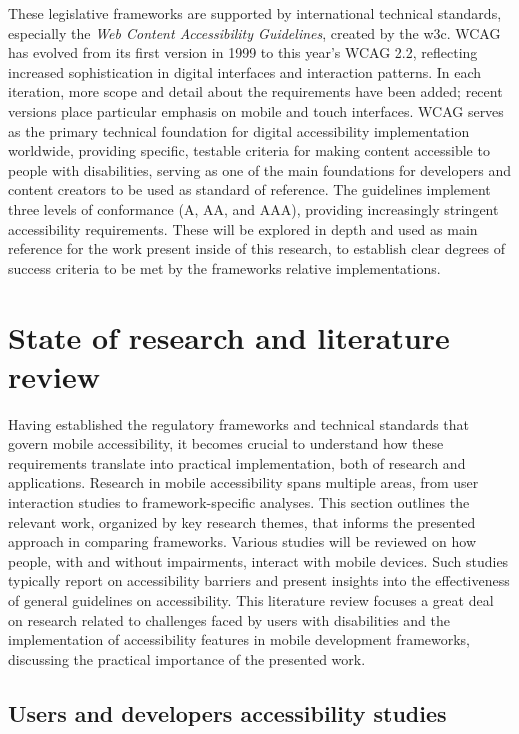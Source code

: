 These legislative frameworks are supported by international technical standards, especially the \textit{Web Content Accessibility Guidelines}, created by the \acrshort{w3c}. WCAG has evolved from its first version in 1999 to this year's WCAG 2.2, reflecting increased sophistication in digital interfaces and interaction patterns. In each iteration, more scope and detail about the requirements have been added; recent versions place particular emphasis on mobile and touch interfaces. WCAG serves as the primary technical foundation for digital accessibility implementation worldwide, providing specific, testable criteria for making content accessible to people with disabilities, serving as one of the main foundations for developers and content creators to be used as standard of reference. The guidelines implement three levels of conformance (A, AA, and AAA), providing increasingly stringent accessibility requirements. These will be explored in depth and used as main reference for the work present inside of this research, to establish clear degrees of success criteria to be met by the frameworks relative implementations.

\section{State of research and literature review}
\label{chap:accessibility-literature}

Having established the regulatory frameworks and technical standards that govern mobile accessibility, it becomes crucial to understand how these requirements translate into practical implementation, both of research and applications. 
Research in mobile accessibility spans multiple areas, from user interaction studies to framework-specific analyses. This section outlines the relevant work, organized by key research themes, that informs the presented approach in comparing frameworks. Various studies will be reviewed on how people, with and without impairments, interact with mobile devices. Such studies typically report on accessibility barriers and present insights into the effectiveness of general guidelines on accessibility. This literature review focuses a great deal on research related to challenges faced by users with disabilities and the implementation of accessibility features in mobile development frameworks, discussing the practical importance of the presented work. \\

\subsection{Users and developers accessibility studies}

